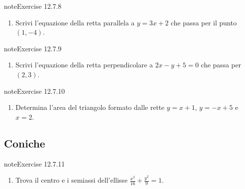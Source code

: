 \documentclass[letterpaper,10pt,italian]{jupyterBook}
\begin{document}
\begin{sphinxadmonition}{note}{Exercise 12.7.8}


\begin{enumerate}
%
\setcounter{enumi}{7}
\item {} 
\sphinxAtStartPar
Scrivi l’equazione della retta parallela a \( y = 3x + 2 \) che passa per il punto \( (1, -4) \).

\end{enumerate}
\end{sphinxadmonition}
 \label{exercise:ch/analytic_geometry/analytic_geometry_2d/sol-exercise-8}

\begin{sphinxadmonition}{note}{Exercise 12.7.9}


\begin{enumerate}
%
\setcounter{enumi}{8}
\item {} 
\sphinxAtStartPar
Scrivi l’equazione della retta perpendicolare a \( 2x - y + 5 = 0 \) che passa per \( (2, 3) \).

\end{enumerate}
\end{sphinxadmonition}
 \label{exercise:ch/analytic_geometry/analytic_geometry_2d/sol-exercise-9}

\begin{sphinxadmonition}{note}{Exercise 12.7.10}


\begin{enumerate}
%
\setcounter{enumi}{9}
\item {} 
\sphinxAtStartPar
Determina l’area del triangolo formato dalle rette \( y = x + 1 \), \( y = -x + 5 \) e \( x = 2 \).

\end{enumerate}
\end{sphinxadmonition}


\subsection{Coniche}
\label{\detokenize{ch/analytic_geometry/analytic_geometry_2d/sol:coniche}} \label{exercise:ch/analytic_geometry/analytic_geometry_2d/sol-exercise-10}

\begin{sphinxadmonition}{note}{Exercise 12.7.11}


\begin{enumerate}
%
\setcounter{enumi}{10}
\item {} 
\sphinxAtStartPar
Trova il centro e i semiassi dell’ellisse \( \frac{x^2}{16} + \frac{y^2}{9} = 1 \).

\end{enumerate}
\end{sphinxadmonition}
 \label{exercise:ch/analytic_geometry/analytic_geometry_2d/sol-exercise-11}
\end{document}
